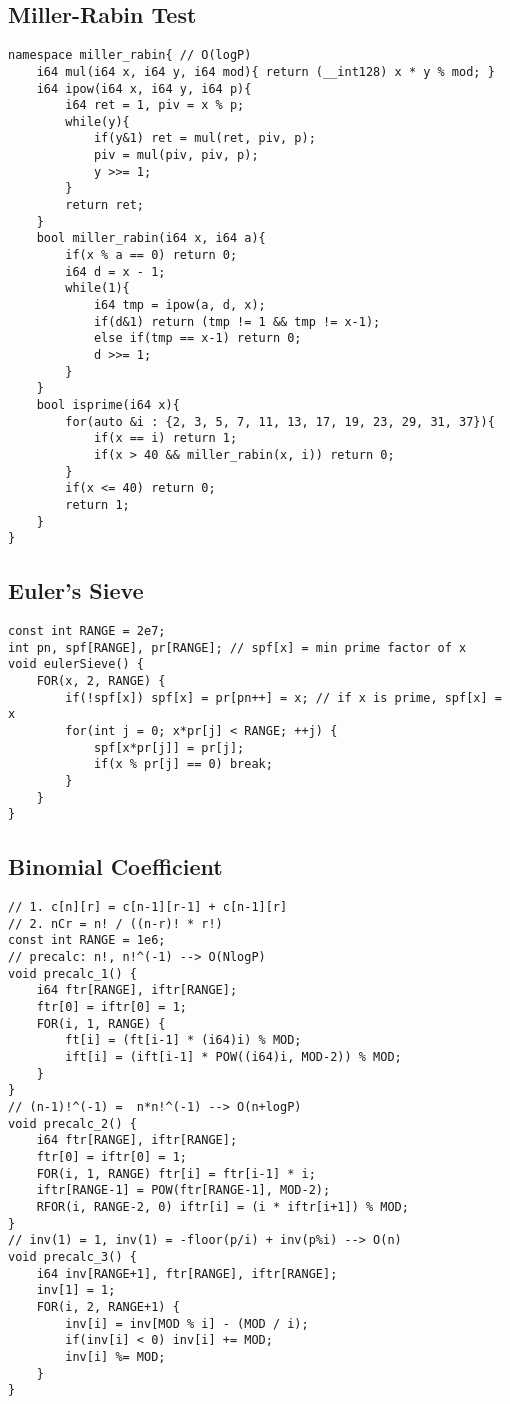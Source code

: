\documentclass[landscape, 8pt, a4paper, oneside, twocolumn]{extarticle}
\begin{document}
\subsection {Miller-Rabin Test}
\begin{verbatim}
namespace miller_rabin{ // O(logP)
	i64 mul(i64 x, i64 y, i64 mod){ return (__int128) x * y % mod; }
	i64 ipow(i64 x, i64 y, i64 p){
		i64 ret = 1, piv = x % p;
		while(y){
			if(y&1) ret = mul(ret, piv, p);
			piv = mul(piv, piv, p);
			y >>= 1;
		}
		return ret;
	}
	bool miller_rabin(i64 x, i64 a){
		if(x % a == 0) return 0;
		i64 d = x - 1;
		while(1){
			i64 tmp = ipow(a, d, x);
			if(d&1) return (tmp != 1 && tmp != x-1);
			else if(tmp == x-1) return 0;
			d >>= 1;
		}
	}
	bool isprime(i64 x){
		for(auto &i : {2, 3, 5, 7, 11, 13, 17, 19, 23, 29, 31, 37}){
			if(x == i) return 1;
			if(x > 40 && miller_rabin(x, i)) return 0;
		}
		if(x <= 40) return 0;
		return 1;
	}
}
\end{verbatim}
\subsection {Euler's Sieve}
\begin{verbatim}
const int RANGE = 2e7;
int pn, spf[RANGE], pr[RANGE]; // spf[x] = min prime factor of x
void eulerSieve() {
	FOR(x, 2, RANGE) {
		if(!spf[x]) spf[x] = pr[pn++] = x; // if x is prime, spf[x] = x
		for(int j = 0; x*pr[j] < RANGE; ++j) {
			spf[x*pr[j]] = pr[j];
			if(x % pr[j] == 0) break;
		}
	}
}
\end{verbatim}
\subsection {Binomial Coefficient}
\begin{verbatim}
// 1. c[n][r] = c[n-1][r-1] + c[n-1][r]
// 2. nCr = n! / ((n-r)! * r!)
const int RANGE = 1e6;
// precalc: n!, n!^(-1) --> O(NlogP)
void precalc_1() {
	i64 ftr[RANGE], iftr[RANGE];
	ftr[0] = iftr[0] = 1;
	FOR(i, 1, RANGE) {
		ft[i] = (ft[i-1] * (i64)i) % MOD;
		ift[i] = (ift[i-1] * POW((i64)i, MOD-2)) % MOD;
	}
}
// (n-1)!^(-1) =  n*n!^(-1) --> O(n+logP)
void precalc_2() {
	i64 ftr[RANGE], iftr[RANGE];
	ftr[0] = iftr[0] = 1;
	FOR(i, 1, RANGE) ftr[i] = ftr[i-1] * i;
	iftr[RANGE-1] = POW(ftr[RANGE-1], MOD-2);
	RFOR(i, RANGE-2, 0) iftr[i] = (i * iftr[i+1]) % MOD;
}
// inv(1) = 1, inv(1) = -floor(p/i) + inv(p%i) --> O(n)
void precalc_3() {
	i64 inv[RANGE+1], ftr[RANGE], iftr[RANGE];
	inv[1] = 1;
	FOR(i, 2, RANGE+1) {
		inv[i] = inv[MOD % i] - (MOD / i);
		if(inv[i] < 0) inv[i] += MOD;
		inv[i] %= MOD;
	}
}
\end{verbatim}
\end{document}
